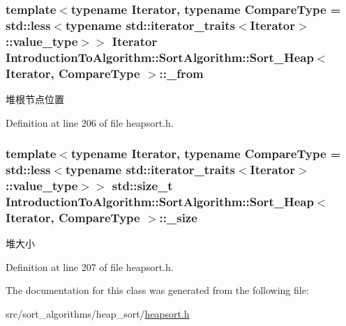 \subsubsection[{\+\_\+from}]{\setlength{\rightskip}{0pt plus 5cm}template$<$typename Iterator, typename Compare\+Type = std\+::less$<$typename std\+::iterator\+\_\+traits$<$\+Iterator$>$\+::value\+\_\+type$>$$>$ Iterator {\bf Introduction\+To\+Algorithm\+::\+Sort\+Algorithm\+::\+Sort\+\_\+\+Heap}$<$ Iterator, Compare\+Type $>$\+::\+\_\+from\hspace{0.3cm}{\ttfamily [private]}}\label{class_introduction_to_algorithm_1_1_sort_algorithm_1_1_sort___heap_a484d28581bfe39a387d90852e38ac36c}
堆根节点位置 

Definition at line 206 of file heapsort.\+h.

\hypertarget{class_introduction_to_algorithm_1_1_sort_algorithm_1_1_sort___heap_a57a42830d3b52d60d2ec1dfd11e2bda6}{}
\subsubsection[{\+\_\+size}]{\setlength{\rightskip}{0pt plus 5cm}template$<$typename Iterator, typename Compare\+Type = std\+::less$<$typename std\+::iterator\+\_\+traits$<$\+Iterator$>$\+::value\+\_\+type$>$$>$ std\+::size\+\_\+t {\bf Introduction\+To\+Algorithm\+::\+Sort\+Algorithm\+::\+Sort\+\_\+\+Heap}$<$ Iterator, Compare\+Type $>$\+::\+\_\+size\hspace{0.3cm}{\ttfamily [private]}}\label{class_introduction_to_algorithm_1_1_sort_algorithm_1_1_sort___heap_a57a42830d3b52d60d2ec1dfd11e2bda6}
堆大小 

Definition at line 207 of file heapsort.\+h.



The documentation for this class was generated from the following file\+:\begin{DoxyCompactItemize}
\item 
src/sort\+\_\+algorithms/heap\+\_\+sort/\hyperlink{heapsort_8h}{heapsort.\+h}\end{DoxyCompactItemize}
